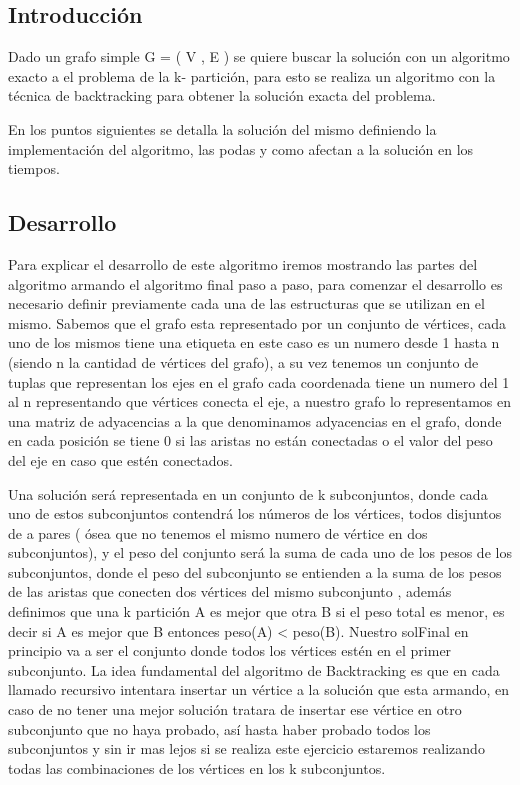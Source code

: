 \subsection{Introducción}

Dado un grafo simple G = ( V , E ) se quiere buscar la solución con un algoritmo exacto a el problema de la k- partición, para esto se realiza un algoritmo con la técnica de backtracking para obtener la solución exacta del problema.

En los puntos siguientes  se detalla la solución del mismo definiendo la implementación del algoritmo, las podas y  como afectan a la solución en los tiempos.

\subsection{Desarrollo}
Para explicar el desarrollo de este algoritmo iremos mostrando las partes del algoritmo armando el algoritmo final paso a paso, para comenzar el desarrollo es necesario definir previamente cada una de las estructuras que se utilizan en el mismo. Sabemos que el grafo esta representado por un conjunto de vértices, cada uno de los mismos tiene una etiqueta en este caso es un numero desde 1 hasta n  (siendo n la cantidad de vértices del grafo),  a su vez tenemos un conjunto de tuplas que representan los ejes en el grafo cada coordenada tiene un numero del 1 al n representando que vértices conecta el eje, a nuestro grafo lo representamos en una matriz de adyacencias a la que denominamos adyacencias en el grafo, donde en cada posición se tiene 0 si las aristas no están conectadas o el valor del peso del eje en caso que estén conectados.

Una solución será representada en un conjunto de k subconjuntos, donde cada uno de estos subconjuntos contendrá los números de los vértices, todos disjuntos de a pares ( ósea que no tenemos el mismo numero de vértice en dos subconjuntos), y el peso del conjunto será la suma de cada uno de los pesos de los subconjuntos, donde el peso del subconjunto se entienden a la suma de los pesos de las aristas que conecten dos vértices del mismo subconjunto , además definimos que una k partición A es mejor que otra B si el peso total es menor, es decir si A es mejor que B entonces peso(A) < peso(B). Nuestro solFinal en principio va a ser el conjunto donde todos los vértices estén en el primer subconjunto.
La idea fundamental del algoritmo de Backtracking  es que en cada llamado recursivo intentara insertar un vértice a la solución que esta armando, en caso de no tener una mejor solución tratara de insertar ese vértice en otro subconjunto que no haya probado, así hasta haber probado todos los subconjuntos y sin ir mas lejos si se realiza este ejercicio estaremos realizando todas las combinaciones de los vértices en los k subconjuntos.	

